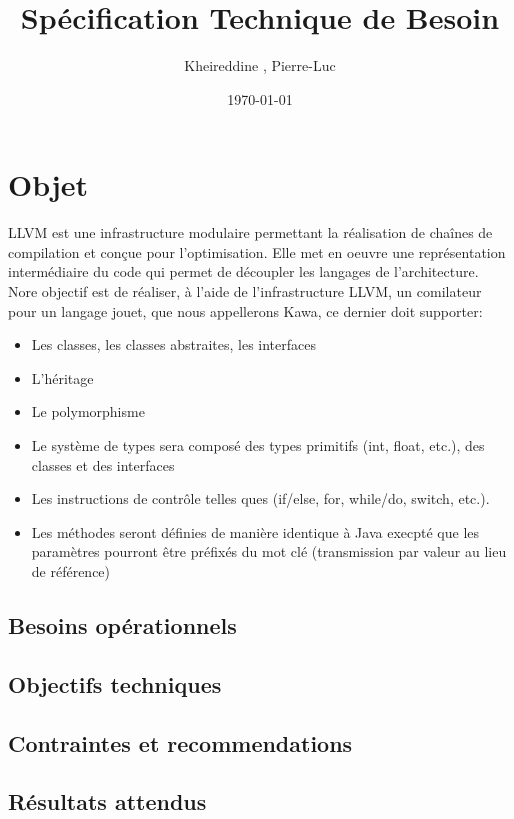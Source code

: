 \documentclass{../res/univ-projet}
\title{Spécification Technique de Besoin}
\author{Kheireddine \bsc{Berkane}, Pierre-Luc \bsc{BLOT}}
\date{\today}
\begin{document}
\maketitle
\newpage
\tableofcontents
\newpage

\section{Objet}

LLVM est une infrastructure modulaire permettant la réalisation de
chaînes de compilation et conçue pour l'optimisation. Elle met en oeuvre
une représentation intermédiaire du code qui permet de découpler les
langages de l'architecture. Nore objectif est de réaliser, à l'aide de
l'infrastructure LLVM, un comilateur pour un langage jouet, que nous
appellerons Kawa, ce dernier doit supporter:
 \begin{itemize}
 	\item	Les classes, les classes abstraites, les interfaces
	\item   L'héritage
	\item   Le polymorphisme
	\item   Le système de types sera composé des types primitifs
	  (int, float, etc.), des classes et des interfaces
	\item   Les instructions de contrôle telles ques (if/else, for,
	  while/do, switch, etc.).
	\item   Les méthodes seront définies de manière identique à Java
	  execpté que les paramètres pourront être préfixés du mot clé
	   (transmission par valeur au lieu de référence)
 \end{itemize}


\subsection{Besoins opérationnels}
\subsection{Objectifs techniques}
\subsection{Contraintes et recommendations}
\subsection{Résultats attendus}
\end{document}

